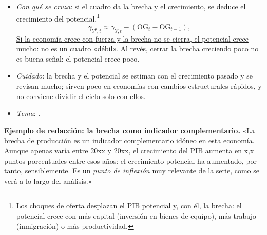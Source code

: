 \documentclass[11pt]{article}
\begin{document}
\begin{itemize}
\begin{itemize}
  \item \emph{Cercana a 0}: paro y uso del capital en sus niveles normales e inflación estable. Es lo deseable.
  \item Su \emph{variación}, medida en puntos, dice si el PIB crece más o menos que el potencial: $\Delta\mathrm{OG}_t\approx\gamma_{Y,t}-\gamma_{Y^p,t}$. «La brecha se cierra» o «se abre» (anexo~\ref{anexo:expresiones}).
  \end{itemize}
\item \emph{Con qué se cruza}: si el cuadro da la brecha y el crecimiento, se deduce el crecimiento del potencial,\footnote{Los choques de oferta desplazan el PIB potencial y, con él, la brecha: el potencial crece con más capital (inversión en bienes de equipo), más trabajo (inmigración) o más productividad.}
\[
\gamma_{Y^p,t}\approx\gamma_{Y,t}-(\mathrm{OG}_t-\mathrm{OG}_{t-1}),
\]
\uline{Si la economía crece con fuerza y la brecha no se cierra, el potencial crece mucho}: no es un cuadro «débil». Al revés, cerrar la brecha creciendo poco no es buena señal: el potencial crece poco.
\item \emph{Cuidado}: la brecha y el potencial se estiman con el crecimiento pasado y se revisan mucho; sirven poco en economías con cambios estructurales rápidos, y no conviene dividir el ciclo solo con ellos.
\item \emph{Tema}:    .
\end{itemize}

\begin{anotaciones}
\textbf{Ejemplo de redacción: la brecha como indicador complementario.}
«La brecha de producción es un indicador complementario idóneo en esta economía. Aunque apenas varía entre 20xx y 20xx, el crecimiento del PIB aumenta en x,x puntos porcentuales entre esos años: el crecimiento potencial ha aumentado, por tanto, sensiblemente. Es un \emph{punto de inflexión} muy relevante de la serie, como se verá a lo largo del análisis.»
\end{anotaciones}
\end{document}
